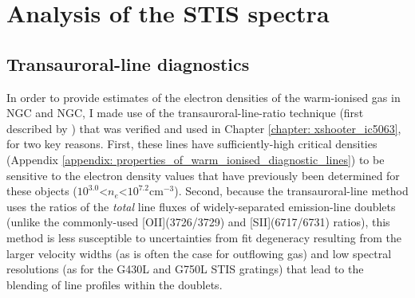 \section{Analysis of the STIS spectra}
\label{section: stis_seyferts: analysis}

\subsection{Transauroral-line diagnostics}
\label{section: stis_seyferts: tr_diagnostics}

In order to provide estimates of the electron densities of the warm-ionised gas in NGC and NGC, I made use of the transauroral-line-ratio technique (first described by \citealt{Holt2011}) that was verified and used in Chapter \ref{chapter: xshooter_ic5063}, for two key reasons. First, these lines have sufficiently-high critical densities (Appendix \ref{appendix: properties_of_warm_ionised_diagnostic_lines}) to be sensitive to the electron density values that have previously been determined for these objects ($10^{3.0}$\;\textless\;$n_e$\;\textless\;$10^{7.2}$\;cm$^{-3}$). Second, because the transauroral-line method uses the ratios of the \textit{total} line fluxes of widely-separated emission-line doublets (unlike the commonly-used [OII](3726/3729) and [SII](6717/6731) ratios), this method is less susceptible to uncertainties from fit degeneracy resulting from the larger velocity widths (as is often the case for outflowing gas) and low spectral resolutions (as for the G430L and G750L STIS gratings) that lead to the blending of line profiles within the doublets. 

